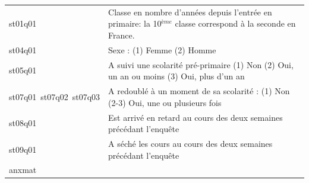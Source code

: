 \documentclass[12pt,twosided, notitlepage]{book}
\begin{document}
\begin{longtable}[]{@{}ll@{}}
\begin{minipage}[t]{0.38\columnwidth}
st01q01\strut
\end{minipage} & \begin{minipage}[t]{0.55\columnwidth}\raggedright\strut
Classe en nombre d'années depuis l'entrée en primaire: la 10\(^{ème}\)
classe correspond à la seconde en France.\strut
\end{minipage}\tabularnewline
\begin{minipage}[t]{0.38\columnwidth}\raggedright\strut
st04q01\strut
\end{minipage} & \begin{minipage}[t]{0.55\columnwidth}\raggedright\strut
Sexe : (1) Femme (2) Homme\strut
\end{minipage}\tabularnewline
\begin{minipage}[t]{0.38\columnwidth}\raggedright\strut
st05q01\strut
\end{minipage} & \begin{minipage}[t]{0.55\columnwidth}\raggedright\strut
A suivi une scolarité pré-primaire (1) Non (2) Oui, un an ou moins (3)
Oui, plus d'un an\strut
\end{minipage}\tabularnewline
\begin{minipage}[t]{0.38\columnwidth}\raggedright\strut
st07q01~st07q02~st07q03\strut
\end{minipage} & \begin{minipage}[t]{0.55\columnwidth}\raggedright\strut
A redoublé à un moment de sa scolarité : (1) Non (2-3) Oui, une ou
plusieurs fois\strut
\end{minipage}\tabularnewline
\begin{minipage}[t]{0.38\columnwidth}\raggedright\strut
st08q01\strut
\end{minipage} & \begin{minipage}[t]{0.55\columnwidth}\raggedright\strut
Est arrivé en retard au cours des deux semaines précédant
l'enquête\strut
\end{minipage}\tabularnewline
\begin{minipage}[t]{0.38\columnwidth}\raggedright\strut
st09q01\strut
\end{minipage} & \begin{minipage}[t]{0.55\columnwidth}\raggedright\strut
A séché les cours au cours des deux semaines précédant l'enquête\strut
\end{minipage}\tabularnewline
\begin{minipage}[t]{0.38\columnwidth}\raggedright\strut
anxmat\strut
\end{minipage} & \begin{minipage}[t]{0.55\columnwidth}\raggedright\strut

\end{minipage}
\end{longtable}
\end{document}
